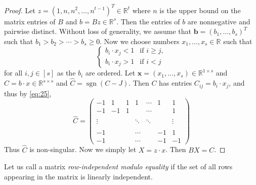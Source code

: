 \documentclass[letterpaper]{article}
\theoremstyle{definition}
\newcommand{\RR}{\mathbb{R}}
\renewcommand{\vec}[1]{\mathbf{#1}} %
\newcommand{\sgn}{\operatorname{sgn}}
\begin{document}
\begin{proof}
	Let $z=(1,n,n^2,\ldots,n^{t-1})^T\in \RR^t$ where $n$ is the upper bound on the matrix entries of $B$  and $b=B z\in\RR^s$. 
	Then the entries of $b$ are nonnegative and pairwise distinct.
	Without loss of generality, we assume that $\vec b=(b_1,\ldots,b_s)^T$ such that $b_1>b_2>\cdots >b_s\ge 0$. Now we choose numbers $x_{1},\ldots,x_s\in\RR$ such that
	\begin{equation}
		\label{eq:25}
		\begin{cases}
			b_{i}\cdot x_j<1 & \text{if }i\ge j, \\
			b_i\cdot x_j>1   & \text{if }i<j     
		\end{cases}
	\end{equation}
	for all $i,j\in[s]$ as the $b_i$ are ordered. 
	Let $\vec x=(x_1,\ldots,x_s)\in\RR^{1\times s}$ and $C=  b\cdot x\in\RR^{s\times s}$ and $\hat C =\sgn(C-J)$. 
	Then $C$ has entries $C_{ij}=b_i\cdot x_j$, and thus by \eqref{eq:25}, 
	\begin{equation}
		\label{eq:29}
		\hat C=
		\begin{pmatrix}
			-1     & 1  & 1 & 1      & \cdots & 1  & 1      \\
			-1     & -1 & 1 &        & \cdots &    & 1      \\
			\\
			\vdots &    &   & \ddots & \ddots &    & \vdots \\
			\\
			-1     &    &   & \cdots &        & -1 & 1      \\
			-1     &    &   & \cdots &        & -1 & -1     
		\end{pmatrix}
	\end{equation}
	Thus $\hat C$ is non-singular. Now we simply let $X= z\cdot x$. Then $BX=C$.
\end{proof}
Let us call a matrix \emph{row-independent modulo equality} if the set
of all rows appearing in the matrix is linearly independent.
\end{document}
